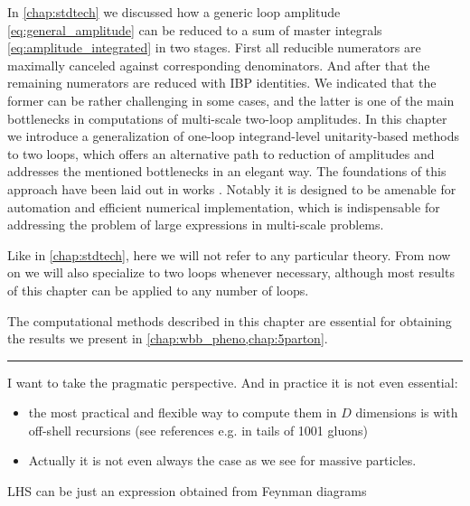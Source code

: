 In \cref{chap:stdtech} we discussed how a generic loop amplitude \eqref{eq:general_amplitude} can be reduced
to a sum of master integrals \eqref{eq:amplitude_integrated} in two stages.
First all reducible numerators are maximally canceled against corresponding denominators.
And after that the remaining numerators are reduced with IBP identities.
We indicated that the former can be rather challenging in some cases,
and the latter is one of the main bottlenecks in computations of
multi-scale two-loop amplitudes.
In this chapter we introduce a generalization of one-loop integrand-level unitarity-based methods \cite{Ossola:2006us,Giele:2008ve,Ellis:2008ir}
to two loops, which offers an alternative path to reduction of amplitudes and addresses the mentioned bottlenecks in an elegant way.
The foundations of this approach have been laid out in works \cite{Ita:2015tya,Abreu:2017xsl,Abreu:2017hqn,Abreu:2017idw}.
Notably it is designed to be amenable for automation and efficient numerical implementation, which is indispensable
for addressing the problem of large expressions in multi-scale problems.


Like in \cref{chap:stdtech}, here we will not refer to any particular theory.
From now on we will also specialize to two loops whenever necessary,
although most results of this chapter
can be applied to any number of loops.

The computational methods described in this chapter are essential for obtaining the results we present in \cref{chap:wbb_pheno,chap:5parton}.

\hrule

I want to take the pragmatic perspective. And in practice it is not even essential:
\begin{itemize}
    \item       the most practical and flexible way to compute them in $D$ dimensions is with off-shell recursions (see references e.g. in tails of 1001 gluons)
    \item Actually it is not even always the case as we see for massive particles.
\end{itemize}

LHS can be just an expression obtained from Feynman diagrams

